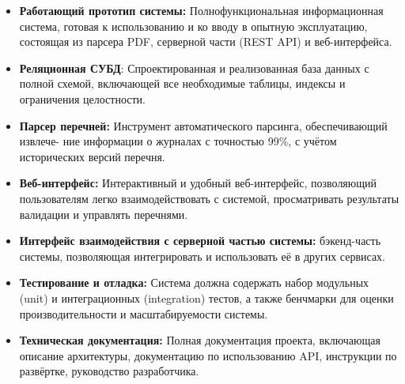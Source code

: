 \begin{itemize}
	\item \textbf{Работающий прототип системы:} Полнофункциональная информационная система,
	готовая к использованию и ко вводу в опытную эксплуатацию, состоящая из парсера PDF, серверной части (REST API) и веб-интерфейса.
	\item \textbf{Реляционная СУБД}: Спроектированная и реализованная база данных с полной схемой,
	включающей все необходимые таблицы, индексы и ограничения целостности.
	\item \textbf{Парсер перечней:} Инструмент автоматического парсинга, обеспечивающий извлече-
	ние информации о журналах с точностью 99\%, с учётом исторических версий перечня.
	\item \textbf{Веб-интерфейс:} Интерактивный и удобный веб-интерфейс, позволяющий пользователям
	легко взаимодействовать с системой, просматривать результаты валидации и управлять перечнями.
	\item \textbf{Интерфейс взаимодействия с серверной частью системы:} бэкенд-часть системы, 
	позволяющая интегрировать и использовать её в других сервисах. 
	\item \textbf{Тестирование и отладка:} Система должна содержать набор модульных (unit) и интеграционных (integration) тестов,
	а также бенчмарки для оценки производительности и масштабируемости системы.
	\item \textbf{Техническая документация:} Полная документация проекта, включающая описание
	архитектуры, документацию по использованию API, инструкции по развёртке, руководство разработчика.
\end{itemize}

